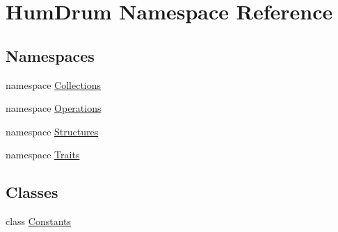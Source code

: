 \hypertarget{namespaceHumDrum}{}\section{Hum\+Drum Namespace Reference}
\label{namespaceHumDrum}
\subsection*{Namespaces}
\begin{DoxyCompactItemize}
\item 
namespace \hyperlink{namespaceHumDrum_1_1Collections}{Collections}
\item 
namespace \hyperlink{namespaceHumDrum_1_1Operations}{Operations}
\item 
namespace \hyperlink{namespaceHumDrum_1_1Structures}{Structures}
\item 
namespace \hyperlink{namespaceHumDrum_1_1Traits}{Traits}
\end{DoxyCompactItemize}
\subsection*{Classes}
\begin{DoxyCompactItemize}
\item 
class \hyperlink{classHumDrum_1_1Constants}{Constants}
\end{DoxyCompactItemize}
